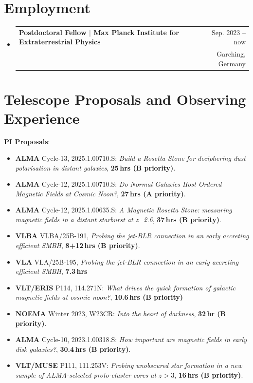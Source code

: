 \documentclass[A4,11pt]{article}
\makeatletter
\newcommand{\CVSubheading}[4]{
  \vspace{-2pt}\item
    \begin{tabular*}{0.97\textwidth}[t]{l@{\extracolsep{\fill}}r}
      \textbf{#1} & #2 \\
      \small#3 & \small #4 \\
    \end{tabular*}\vspace{-7pt}
}
\newcommand{\CVSubHeadingListStart}{\begin{itemize}[leftmargin=0.5cm, label={}]}
\newcommand{\CVSubHeadingListEnd}{\end{itemize}}
\newenvironment{paperlist}
{ \begin{itemize}[leftmargin=0.8cm, label={$\bullet$}]
    \setlength{\itemsep}{1pt}
    \setlength{\parskip}{1pt}
    \setlength{\parsep}{1pt}     }
{ \end{itemize}                  }
\makeatother
\begin{document}
\section{Employment}
  \CVSubHeadingListStart
    \CVSubheading
    {{Postdoctoral Fellow $|$ {\small{Max Planck Institute for Extraterrestrial Physics}}}}{Sep. 2023 -- now}
     {\emph{}}{Garching, Germany}
  \CVSubHeadingListEnd


\section{Telescope Proposals and Observing Experience}
\textbf{PI Proposals}:\\
\vspace{-0.8em}
\begin{paperlist}
  \item \textbf{ALMA} Cycle-13, 2025.1.00710.S: \emph{Build a Rosetta Stone for deciphering dust polarisation in distant galaxies}, \textbf{25\,hrs (B priority)}. 
  \item \textbf{ALMA} Cycle-12, 2025.1.00710.S: \emph{Do Normal Galaxies Host Ordered Magnetic Fields at Cosmic Noon?}, \textbf{27\,hrs (A priority)}. 
  \item \textbf{ALMA} Cycle-12, 2025.1.00635.S: \emph{A Magnetic Rosetta Stone: measuring magnetic fields in a distant starburst at z=2.6}, \textbf{37\,hrs (B priority)}. 
  \item \textbf{VLBA} VLBA/25B-191, \emph{Probing the jet-BLR connection in an early accreting efficient SMBH}, \textbf{8+12\,hrs (B priority)}.
  \item \textbf{VLA} VLA/25B-195, \emph{Probing the jet-BLR connection in an early accreting efficient SMBH}, \textbf{7.3\,hrs}
  \item \textbf{VLT/ERIS} P114, 114.271N: \emph{What drives the quick formation of galactic magnetic fields at cosmic noon?}, \textbf{10.6\,hrs (B priority)}
  \item \textbf{NOEMA} Winter 2023, W23CR: \emph{Into the heart of darkness}, \textbf{32\,hr (B priority)}.
  \item \textbf{ALMA} Cycle-10, 2023.1.00318.S: \emph{How important are magnetic fields in early disk galaxies?}, \textbf{30.4\,hrs (B priority)}. 
  \item \textbf{VLT/MUSE} P111, 111.253V: \emph{Probing unobscured star formation in a new sample of ALMA-selected proto-cluster cores at $z>3$}, \textbf{16\,hrs (B priority)}.

\end{paperlist}
\end{document}

